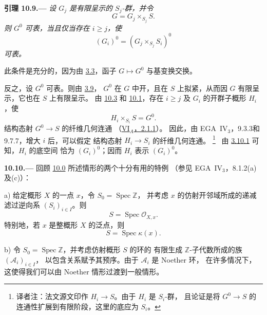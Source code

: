 
\medskip
{}\label{lem:sga3-VIB-10.9}%
\noindent\textbf{引理 10.9.---}
\emph{设 \(G_j\) 是有限呈示的 \(S_j\)-群，并令
\[
  G=G_j\times_{S_j}S.
\]
则 \(G^0\) 可表，当且仅当存在 \(i\geq j\)，使
\[
  (G_i)^0=(G_j\times_{S_j}S_i)^0
\]
可表。}

此条件是充分的，因为由 \hyperref[prop:sga3-VIB-3.3]{3.3}，函子
\(G\longmapsto G^0\) 与基变换交换。

反之，设 \(G^0\) 可表。则由 \hyperref[prop:sga3-VIB-3.9]{3.9}，
\(G^0\) 在 \(G\) 中开，且在 \(S\) 上拟紧，从而因 \(G\)
有限呈示，它也在 \(S\) 上有限呈示。
由 \hyperref[lem:sga3-VIB-10.3]{10.3} 和
\hyperref[par:sga3-VIB-10.1]{10.1}，存在 \(i\geq j\) 及
\(G_i\) 的开群子概形 \(H_i\)，使
\[
  H_i\times_{S_i}S=G^0.
\]
结构态射 \(G^0\to S\) 的纤维几何连通
\textup{（\hyperref[prop:sga3-VIA-2.1.1]{VI\(_A\)，2.1.1}）}。
因此，由 EGA~IV\(_3\)，9.3.3和9.7.7，增大 \(i\) 后，可以假定
结构态射 \(H_i\to S_i\) 的纤维几何连通。%
\begingroup
\renewcommand{\thefootnote}{\fnsymbol{footnote}}%
\footnote[1]{\label{note:sga3-VIB-10.9-Hi-base}
译者注：法文源文印作 \(H_i\to S\)。由于 \(H_i\) 是 \(S_i\)-群，
且论证是将 \(G^0\to S\) 的连通性扩展到有限阶段，这里的底应为 \(S_i\)。}%
\endgroup\ 
由 \hyperref[lem:sga3-VIB-3.10.1]{3.10.1} 可知，\(H_i\) 的底空间
恰为 \((G_i)^0\)；因而 \(H_i\) 表示 \((G_i)^0\)。

\medskip
{}\label{par:sga3-VIB-10.10}%
\noindent\textbf{10.10.---}
回顾 \hyperref[par:sga3-VIB-10.0]{10.0} 所述情形的两个十分有用的特例
\textup{（参见 EGA~IV\(_3\)，8.1.2\textup{(a)}及\textup{(c)}）}：

\smallskip
{}\label{par:sga3-VIB-10.10-a}%
\noindent\textup{a)}
给定概形 \(X\) 的一点 \(x\)，令 \(S_0=\operatorname{Spec}\mathbb Z\)，
并考虑 \(x\) 的仿射开邻域所成的递减滤过逆向系 \((S_i)_{i\in I}\)。则
\[
  S=\operatorname{Spec}\mathcal O_{X,x}.
\]
特别地，若 \(x\) 是整概形 \(X\) 的泛点，则
\[
  S=\operatorname{Spec}\kappa(x).
\]

\smallskip
{}\label{par:sga3-VIB-10.10-b}%
\noindent\textup{b)}
令 \(S_0=\operatorname{Spec}\mathbb Z\)，并考虑仿射概形 \(S\) 的环的
有限生成 \(\mathbb Z\)-子代数所成的族 \((\mathcal A_i)_{i\in I}\)，
以包含关系赋予其预序。由于 \(\mathcal A_i\) 是 Noether 环，
在许多情况下，这使得我们可以由 Noether 情形过渡到一般情形。


